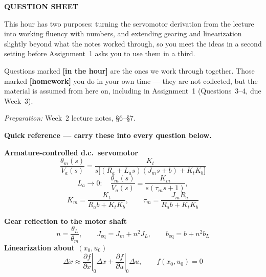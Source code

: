 \documentclass[11pt,a4paper]{article}
\newif\ifsolutions
\begin{document}
\weektitle

\begin{center}
\ifsolutions
  {\large\sffamily\bfseries\color{fflag}QUESTIONS AND SOLUTIONS}\\[2pt]
  {\small\itshape Instructor copy --- do not circulate before the tutorial.}
\else
  {\large\sffamily\bfseries\color{fnavy}QUESTION SHEET}
\fi
\end{center}

\bigskip
\noindent
This hour has two purposes: turning the servomotor derivation from the lecture
into working fluency with numbers, and extending gearing and linearization
slightly beyond what the notes worked through, so you meet the ideas in a
second setting before Assignment~1 asks you to use them in a third.

\smallskip
\noindent
Questions marked \textbf{\color{faccent}[in the hour]} are the ones we work
through together. Those marked \textbf{\color{fflag}[homework]} you do in your
own time --- they are not collected, but the material is assumed from here on,
including in Assignment~1 (Questions~3--4, due Week~3).

\smallskip
\noindent
\emph{Preparation:} Week~2 lecture notes, \S6--\S7.

\begin{readingbox}
\textbf{Quick reference --- carry these into every question below.}

\smallskip
\begin{minipage}[t]{0.48\textwidth}
\textbf{Armature-controlled d.c.\ servomotor}\\[2pt]
\footnotesize
\[
  \frac{\theta_m(s)}{V_a(s)}=\frac{K_t}{s\big[(R_a+L_as)(J_ms+b)+K_tK_b\big]}
\]
\[
  L_a\to0:\quad \frac{\theta_m(s)}{V_a(s)}=\frac{K_m}{s(\tau_ms+1)},
\]
\[
  K_m=\frac{K_t}{R_ab+K_tK_b},\qquad \tau_m=\frac{J_mR_a}{R_ab+K_tK_b}
\]
\end{minipage}
\hfill
\begin{minipage}[t]{0.48\textwidth}
\textbf{Gear reflection to the motor shaft}\\[2pt]
\footnotesize
\[
  n=\frac{\theta_L}{\theta_m},\qquad
  J_{\text{eq}}=J_m+n^2J_L,\qquad
  b_{\text{eq}}=b+n^2b_L
\]
\medskip
\textbf{Linearization about $(x_0,u_0)$}
\[
  \Delta\dot x \approx
  \left.\frac{\partial f}{\partial x}\right|_{0}\!\Delta x
  +\left.\frac{\partial f}{\partial u}\right|_{0}\!\Delta u,
  \qquad f(x_0,u_0)=0
\]
\end{minipage}
\end{readingbox}
\end{document}
